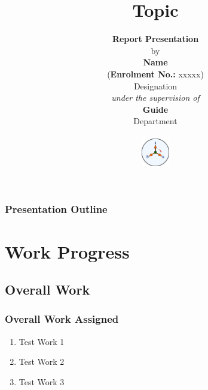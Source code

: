 \documentclass[aspectratio=169,12pt]{beamer}
\newcounter{cont}
\newcommand\ftitle[1]{\frametitle{\large\textbf{#1}}}
\begin{document}
\title{\textbf{Topic}}
\author{\textbf{Report Presentation} \\
{\scriptsize by} \\
\textbf{Name} \\{\scriptsize (\textbf{Enrolment No.:} xxxxx)} \\
{\scriptsize Designation} \\
\vspace{1mm}
{\scriptsize\emph{under the supervision of}} \\
\vspace{1mm}
{\textbf{Guide}} \\
{\scriptsize Department} \\
\begin{center}
	\includegraphics[width=1.2cm]{Logo}
\end{center}
\vspace{-0.25cm}
{\scriptsize {}}}


\begin{frame}
	\titlepage
\end{frame}

\scriptsize
\setcounter{framenumber}{0}


\begin{frame}
	\ftitle{Presentation Outline}
	\tableofcontents
\end{frame}


\section{Work Progress}

\subsection{Overall Work}
\begin{frame}
	\ftitle{Overall Work Assigned}
	\renewcommand{\theenumi}{\alph{enumi}}
	\begin{enumerate}
		\item Test Work 1
		\item Test Work 2
		\item Test Work 3
	\end{enumerate}
\end{frame}
\end{document}
